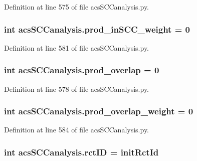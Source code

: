 Definition at line 575 of file acs\-S\-C\-Canalysis.\-py.

\hypertarget{a00097_aa22adccedd9ae548d0687df507ebd92d}{
\subsubsection[{prod\-\_\-in\-S\-C\-C\-\_\-weight}]{\setlength{\rightskip}{0pt plus 5cm}int acs\-S\-C\-Canalysis.\-prod\-\_\-in\-S\-C\-C\-\_\-weight = 0}}\label{a00097_aa22adccedd9ae548d0687df507ebd92d}


Definition at line 581 of file acs\-S\-C\-Canalysis.\-py.

\hypertarget{a00097_a213e964195f0666d00663ca874a09caa}{
\subsubsection[{prod\-\_\-overlap}]{\setlength{\rightskip}{0pt plus 5cm}int acs\-S\-C\-Canalysis.\-prod\-\_\-overlap = 0}}\label{a00097_a213e964195f0666d00663ca874a09caa}


Definition at line 578 of file acs\-S\-C\-Canalysis.\-py.

\hypertarget{a00097_ab78b07d6cd1a94356c4fee43dfc1272a}{
\subsubsection[{prod\-\_\-overlap\-\_\-weight}]{\setlength{\rightskip}{0pt plus 5cm}int acs\-S\-C\-Canalysis.\-prod\-\_\-overlap\-\_\-weight = 0}}\label{a00097_ab78b07d6cd1a94356c4fee43dfc1272a}


Definition at line 584 of file acs\-S\-C\-Canalysis.\-py.

\hypertarget{a00097_a78ffc7d3b69c53ec5389a151e7fdcb83}{
\subsubsection[{rct\-I\-D}]{\setlength{\rightskip}{0pt plus 5cm}int acs\-S\-C\-Canalysis.\-rct\-I\-D = {\bf init\-Rct\-Id}}}\label{a00097_a78ffc7d3b69c53ec5389a151e7fdcb83}


